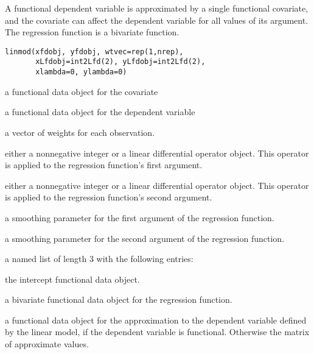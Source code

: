 \documentclass{article}
\begin{document}
\begin{Description}\relax
A functional dependent variable is approximated by a single
functional covariate, and the
covariate can affect the dependent variable for all
values of its argument.  The regression function is a bivariate function.
\end{Description}
\begin{Usage}
\begin{verbatim}
linmod(xfdobj, yfdobj, wtvec=rep(1,nrep),
       xLfdobj=int2Lfd(2), yLfdobj=int2Lfd(2),
       xlambda=0, ylambda=0)
\end{verbatim}
\end{Usage}
\begin{Arguments}
\begin{ldescription}
\item[\code{xfdobj}] a functional data object for the covariate

\item[\code{yfdobj}] a functional data object for the dependent variable

\item[\code{wtvec}] a vector of weights for each observation.

\item[\code{xLfdobj}] either a nonnegative integer or a linear differential operator
object.  This operator is applied to the regression function's
first argument.

\item[\code{yLfdobj}] either a nonnegative integer or a linear differential operator
object.  This operator is applied to the regression function's
second argument.

\item[\code{xlambda}] a smoothing parameter for the first argument of the regression
function.

\item[\code{ylambda}] a smoothing parameter for the second argument of the regression
function.

\end{ldescription}
\end{Arguments}
\begin{Value}
a named list of length 3 with the following entries:

\begin{ldescription}
\item[\code{alphafd}] the intercept functional data object.

\item[\code{regfd}] a bivariate functional data object for the regression function.

\item[\code{yhatfd}] a functional data object for the approximation to the dependent variable
defined by the linear model, if the dependent variable is functional.
Otherwise the matrix of approximate values.

\end{ldescription}
\end{Value}
\end{document}
